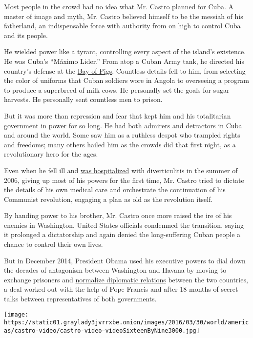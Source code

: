 Most people in the crowd had no idea what Mr. Castro planned for Cuba. A
master of image and myth, Mr. Castro believed himself to be the messiah
of his fatherland, an indispensable force with authority from on high to
control Cuba and its people.

He wielded power like a tyrant, controlling every aspect of the island's
existence. He was Cuba's ``Máximo Lider.'' From atop a Cuban Army tank,
he directed his country's defense at the
\href{http://learning.blogs.nytimes3xbfgragh.onion/2012/04/17/april-17-1961-the-bay-of-pigs-invasion-against-castro/}{Bay
of Pigs}. Countless details fell to him, from selecting the color of
uniforms that Cuban soldiers wore in Angola to overseeing a program to
produce a superbreed of milk cows. He personally set the goals for sugar
harvests. He personally sent countless men to prison.

But it was more than repression and fear that kept him and his
totalitarian government in power for so long. He had both admirers and
detractors in Cuba and around the world. Some saw him as a ruthless
despot who trampled rights and freedoms; many others hailed him as the
crowds did that first night, as a revolutionary hero for the ages.

Even when he fell ill and
\href{http://www.nytimes3xbfgragh.onion/2007/01/16/world/americas/16fidel.html}{was
hospitalized} with diverticulitis in the summer of 2006, giving up most
of his powers for the first time, Mr. Castro tried to dictate the
details of his own medical care and orchestrate the continuation of his
Communist revolution, engaging a plan as old as the revolution itself.

By handing power to his brother, Mr. Castro once more raised the ire of
his enemies in Washington. United States officials condemned the
transition, saying it prolonged a dictatorship and again denied the
long-suffering Cuban people a chance to control their own lives.

But in December 2014, President Obama used his executive powers to dial
down the decades of antagonism between Washington and Havana by moving
to exchange prisoners and
\href{http://www.nytimes3xbfgragh.onion/2014/12/18/world/americas/us-cuba-relations.html}{normalize
diplomatic relations} between the two countries, a deal worked out with
the help of Pope Francis and after 18 months of secret talks between
representatives of both governments.

\texttt{[image: https://static01.graylady3jvrrxbe.onion/images/2016/03/30/world/americas/castro-video/castro-video--videoSixteenByNine3000.jpg]}

